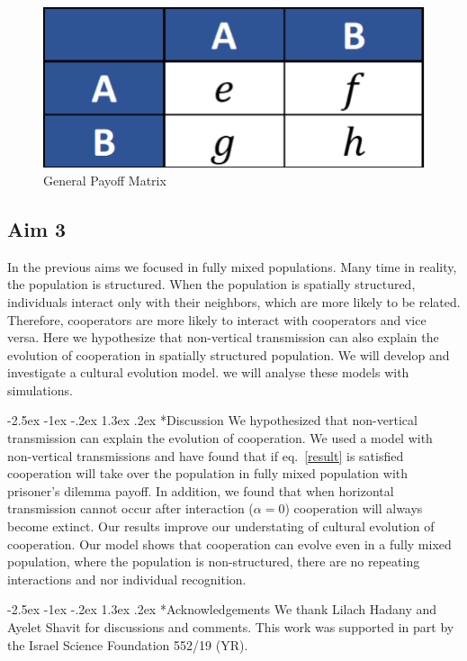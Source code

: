 \documentclass[12pt]{extarticle}
\makeatletter
\renewcommand\section{\@startsection {section}{1}{\z@}%
     {-2.5ex \@plus -1ex \@minus -.2ex}%
     {1.3ex \@plus.2ex}%
    {\Large\bfseries}}
\makeatother
\begin{document}
\begin{figure}[h!]
  \centering
  \includegraphics[scale=0.4]{generalpayoff.pdf}
  \caption{General Payoff Matrix}
  \label{fig:generalPayoff}
\end{figure}

\subsection*{Aim 3}
In the previous aims we focused in fully mixed populations. Many time in reality, the population is structured. When the population is spatially structured, individuals interact only with their neighbors, which are more likely to be related. Therefore, cooperators are more likely to interact with cooperators and vice versa. Here we hypothesize that non-vertical transmission can also explain the evolution of cooperation in spatially structured population. We will develop and investigate a cultural evolution model. 
we will analyse these models with simulations. 

\section*{Discussion}
We hypothesized that non-vertical transmission can explain the evolution of cooperation. We used a model with non-vertical transmissions and have found that if eq.~\eqref{result} is satisfied cooperation will take over the population in fully mixed population with prisoner's dilemma payoff. In addition, we found that when horizontal transmission cannot occur after interaction ($\alpha = 0$) cooperation will always become extinct. 
Our results improve our understating of cultural evolution of cooperation. Our model shows that cooperation can evolve even in a fully mixed population, where the population is non-structured, there are no repeating interactions and nor individual recognition.

{\small
\section*{Acknowledgements}
We thank Lilach Hadany and Ayelet Shavit for discussions and comments.
This work was supported in part by
the Israel Science Foundation 552/19 (YR).
}
\end{document}
